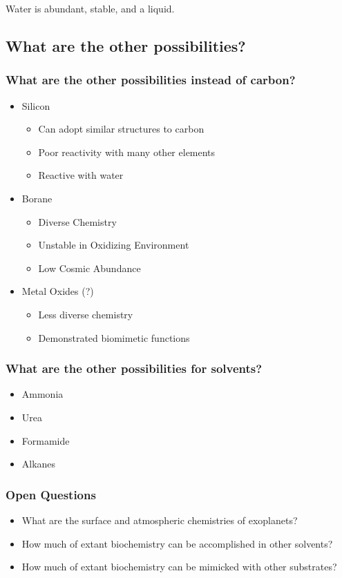 \documentclass[]{article}
\begin{document}
Water is abundant, stable, and a liquid.

\subsection{What are the other possibilities?}

\subsubsection{What are the other possibilities instead of carbon?}

\begin{itemize}
	\item Silicon
	\begin{itemize}
		\item Can adopt similar structures to carbon
		\item Poor reactivity with many other elements
		\item Reactive with water
	\end{itemize}
	\item Borane
	\begin{itemize}
		\item Diverse Chemistry
		\item Unstable in Oxidizing Environment
		\item Low Cosmic Abundance
	\end{itemize}
	\item Metal Oxides (?)
	\begin{itemize}
		\item 	Less diverse chemistry
		\item Demonstrated biomimetic functions
	\end{itemize}
\end{itemize}

\subsubsection{What are the other possibilities for solvents?}
\begin{itemize}
	\item Ammonia
	\item Urea
	\item Formamide
	\item Alkanes
\end{itemize}

\subsubsection{Open Questions}
\begin{itemize}
	\item What are the surface and atmospheric chemistries of
	exoplanets?
	\item How much of extant biochemistry can be accomplished
	in other solvents?
	\item How much of extant biochemistry can be mimicked with
	other substrates?
\end{itemize}
\end{document}
